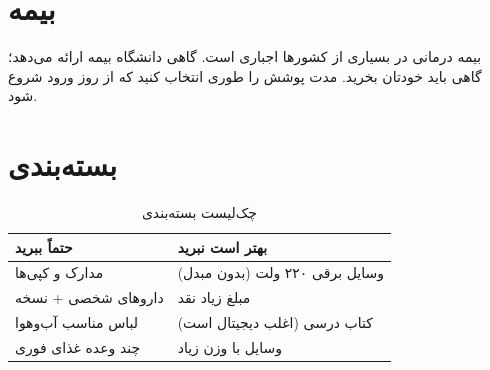 \section{بیمه}

بیمه درمانی در بسیاری از کشورها اجباری است.
گاهی دانشگاه بیمه ارائه می‌دهد؛ گاهی باید خودتان بخرید.
مدت پوشش را طوری انتخاب کنید که از روز ورود شروع شود.

\section{بسته‌بندی}

\begin{table}[htbp]
  \centering
  \caption{چک‌لیست بسته‌بندی}
  \label{tab:packing}
  \begin{tabular}{@{}p{}p{}@{}}
    \toprule
    \textbf{حتماً ببرید} & \textbf{بهتر است نبرید} \\
    \midrule
    مدارک و کپی‌ها & وسایل برقی ۲۲۰ ولت (بدون مبدل) \\
    داروهای شخصی + نسخه & مبلغ زیاد نقد \\
    لباس مناسب آب‌وهوا & کتاب درسی (اغلب دیجیتال است) \\
    چند وعده غذای فوری & وسایل با وزن زیاد \\
    \bottomrule
  \end{tabular}
\end{table}
